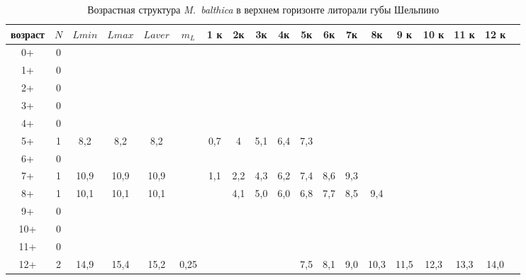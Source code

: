 \begin{landscape}
\begin{table}[h]
\caption{Возрастная структура {\it M.~balthica} в верхнем горизонте литорали губы Шельпино}
\label{tab:Shelpino_vgl_growth_matrix}
\begin{tabular}{|c|c|cc|cc|ccccccccccccc|}
    \hline
возраст & $N$ & $L min$ & $L max$ & $L aver$ & $m_L$   & 1 к  & 2к   & 3к  & 4к   & 5к   & 6к   & 7к   & 8к   & 9 к  & 10 к & 11 к & 12 к &  \\ \hline
0+      & 0 &       &       &         &         &      &      &     &      &      &      &      &      &      &      &      &      &  \\
1+      & 0 &       &       &         &         &      &      &     &      &      &      &      &      &      &      &      &      &  \\
2+      & 0 &       &       &         &         &      &      &     &      &      &      &      &      &      &      &      &      &  \\
3+      & 0 &       &       &         &         &      &      &     &      &      &      &      &      &      &      &      &      &  \\
4+      & 0 &       &       &         &         &      &      &     &      &      &      &      &      &      &      &      &      &  \\
5+      & 1 & 8,2   & 8,2   & 8,2     &         & 0,7  & 4    & 5,1 & 6,4  & 7,3  &      &      &      &      &      &      &      &  \\
6+      & 0 &       &       &         &         &      &      &     &      &      &      &      &      &      &      &      &      &  \\
7+      & 1 & 10,9  & 10,9  & 10,9    &         & 1,1  & 2,2  & 4,3 & 6,2  & 7,4  & 8,6  & 9,3  &      &      &      &      &      &  \\
8+      & 1 & 10,1  & 10,1  & 10,1    &         &      & 4,1  & 5,0 & 6,0  & 6,8  & 7,7  & 8,5  & 9,4  &      &      &      &      &  \\
9+      & 0 &       &       &         &         &      &      &     &      &      &      &      &      &      &      &      &      &  \\
10+     & 0 &       &       &         &         &      &      &     &      &      &      &      &      &      &      &      &      &  \\
11+     & 0 &       &       &         &         &      &      &     &      &      &      &      &      &      &      &      &      &  \\
12+     & 2 & 14,9  & 15,4  & 15,2    & 0,25    &      &      &     &      & 7,5  & 8,1  & 9,0  & 10,3 & 11,5 & 12,3 & 13,3 & 14,0 &  \\ \hline

\end{tabular}
\end{table}
\end{landscape}
